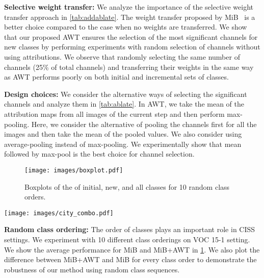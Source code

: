 \noindent\textbf{Selective weight transfer:} We analyze the importance of the selective weight transfer approach in \cref{tab:addablate}. 
The weight transfer proposed by MiB~\cite{cermelli2020modeling} is a better choice compared to the case when no weights are transferred. We show that our proposed AWT ensures the selection of the most significant channels for new classes by performing experiments with random selection of channels without using attributions. We observe that randomly selecting the same number of channels (25\% of total channels) and transferring their weights in the same way as AWT performs poorly on both initial and incremental sets of classes.

\noindent\textbf{Design choices:} We consider the alternative ways of selecting the significant channels and analyze them in \cref{tab:ablate}. In AWT, we take the mean of the attribution maps from all images of the current step and then perform max-pooling. Here, we consider the alternative of pooling the channels first for all the images and then take the mean of the pooled values. We also consider using average-pooling instead of max-pooling. We experimentally show that mean followed by max-pool is the best choice for channel selection.



\begin{figure}[t]
\centering
\texttt{[image: images/boxplot.pdf]}
\caption{Boxplots of the \miou{} of initial, new, and all classes for 10 random class orders.}
\label{fig:boxplot}
\end{figure}

\begin{figure*}[t]
\texttt{[image: images/city\_combo.pdf]}
    \caption{Visualization of predictions using MiB and MiB+AWT in 14-1 setting for Cityscapes. MiB is highly biased towards the new classes and classifies the \emph{bus} as \emph{train} (row 1) while MiB+AWT correctly classifies the \emph{bus} (row 2).}
    \label{fig:combo2}
\end{figure*}

\noindent\textbf{Random class ordering:} The order of classes plays an important role in CISS settings. We experiment with 10 different class orderings on VOC 15-1 setting. We show the average performance for MiB and MiB+AWT in \cref{fig:boxplot}. We also plot the difference between MiB+AWT and MiB for every class order to demonstrate the robustness of our method using random class sequences.

